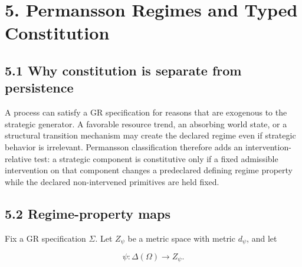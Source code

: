 \documentclass[10pt]{article}
\begin{document}
\section{5. Permansson Regimes and Typed
Constitution}\label{permansson-regimes-and-typed-constitution}

\subsection{5.1 Why constitution is separate from
persistence}\label{why-constitution-is-separate-from-persistence}

A process can satisfy a GR specification for reasons that are exogenous
to the strategic generator. A favorable resource trend, an absorbing
world state, or a structural transition mechanism may create the
declared regime even if strategic behavior is irrelevant. Permansson
classification therefore adds an intervention-relative test: a strategic
component is constitutive only if a fixed admissible intervention on
that component changes a predeclared defining regime property while the
declared non-intervened primitives are held fixed.

\subsection{5.2 Regime-property maps}\label{regime-property-maps}

Fix a GR specification \(\Sigma\). Let \(Z_\psi\) be a metric space with
metric \(d_\psi\), and let

\begin{equation}
\psi:\Delta(\Omega)\longrightarrow Z_\psi.
\tag{14}\label{eq:14}
\end{equation}
\end{document}
